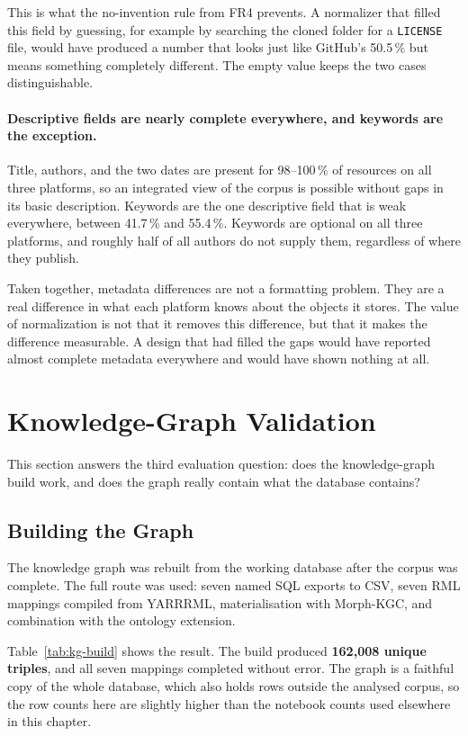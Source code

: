 This is what the no-invention rule from FR4 prevents. A normalizer that filled this field by guessing, for example by searching the cloned folder for a \texttt{LICENSE} file, would have produced a number that looks just like GitHub's 50.5\,\% but means something completely different. The empty value keeps the two cases distinguishable.

\paragraph{Descriptive fields are nearly complete everywhere, and keywords are the exception.} Title, authors, and the two dates are present for 98--100\,\% of resources on all three platforms, so an integrated view of the corpus is possible without gaps in its basic description. Keywords are the one descriptive field that is weak everywhere, between 41.7\,\% and 55.4\,\%. Keywords are optional on all three platforms, and roughly half of all authors do not supply them, regardless of where they publish.

Taken together, metadata differences are not a formatting problem. They are a real difference in what each platform knows about the objects it stores. The value of normalization is not that it removes this difference, but that it makes the difference measurable. A design that had filled the gaps would have reported almost complete metadata everywhere and would have shown nothing at all.

\section{Knowledge-Graph Validation}
\label{sec:eval-kg}

This section answers the third evaluation question: does the knowledge-graph build work, and does the graph really contain what the database contains?

\subsection{Building the Graph}

The knowledge graph was rebuilt from the working database after the corpus was complete. The full route was used: seven named SQL exports to CSV, seven RML mappings compiled from YARRRML, materialisation with Morph-KGC, and combination with the ontology extension.

Table~\ref{tab:kg-build} shows the result. The build produced \textbf{162{,}008 unique triples}, and all seven mappings completed without error. The graph is a faithful copy of the whole database, which also holds rows outside the analysed corpus, so the row counts here are slightly higher than the notebook counts used elsewhere in this chapter.

